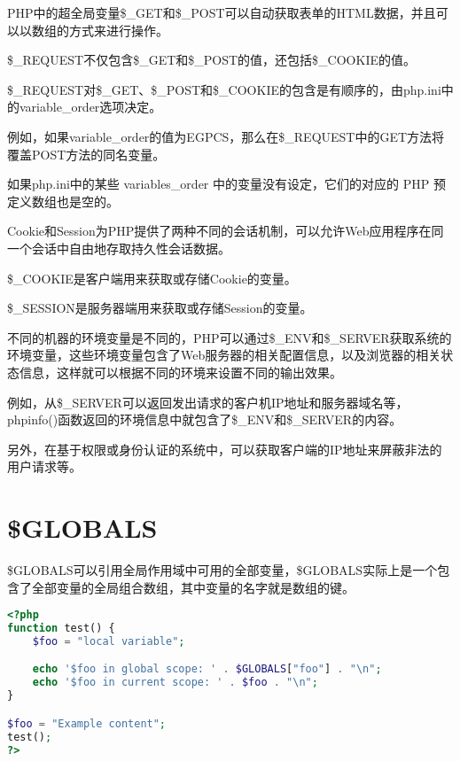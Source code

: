 PHP中的超全局变量\$\_GET和\$\_POST可以自动获取表单的HTML数据，并且可以以数组的方式来进行操作。

\begin{compactitem}
\item \$\_REQUEST不仅包含\$\_GET和\$\_POST的值，还包括\$\_COOKIE的值。

\item \$\_REQUEST对\$\_GET、\$\_POST和\$\_COOKIE的包含是有顺序的，由php.ini中的variable\_order选项决定。
\end{compactitem}

例如，如果variable\_order的值为EGPCS，那么在\$\_REQUEST中的GET方法将覆盖POST方法的同名变量。

如果php.ini中的某些 variables\_order 中的变量没有设定，它们的对应的 PHP 预定义数组也是空的。

Cookie和Session为PHP提供了两种不同的会话机制，可以允许Web应用程序在同一个会话中自由地存取持久性会话数据。

\begin{compactitem}
\item \$\_COOKIE是客户端用来获取或存储Cookie的变量。
\item \$\_SESSION是服务器端用来获取或存储Session的变量。
\end{compactitem}




不同的机器的环境变量是不同的，PHP可以通过\$\_ENV和\$\_SERVER获取系统的环境变量，这些环境变量包含了Web服务器的相关配置信息，以及浏览器的相关状态信息，这样就可以根据不同的环境来设置不同的输出效果。

例如，从\$\_SERVER可以返回发出请求的客户机IP地址和服务器域名等，phpinfo()函数返回的环境信息中就包含了\$\_ENV和\$\_SERVER的内容。


另外，在基于权限或身份认证的系统中，可以获取客户端的IP地址来屏蔽非法的用户请求等。




\section{\$GLOBALS}

\$GLOBALS可以引用全局作用域中可用的全部变量，\$GLOBALS实际上是一个包含了全部变量的全局组合数组，其中变量的名字就是数组的键。


\begin{lstlisting}[language=PHP]
<?php
function test() {
    $foo = "local variable";

    echo '$foo in global scope: ' . $GLOBALS["foo"] . "\n";
    echo '$foo in current scope: ' . $foo . "\n";
}

$foo = "Example content";
test();
?>
\end{lstlisting}

